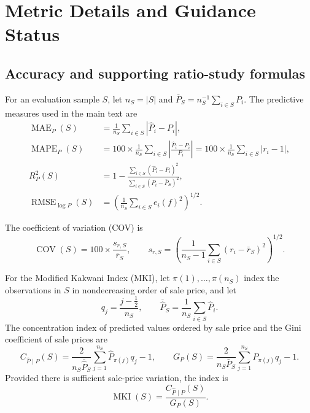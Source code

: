 \documentclass[10pt]{article}
\theoremstyle{definition}
\newcommand{\1}{\mathbf{1}}
\begin{document}
\printbibliography


\appendix

\section{Metric Details and Guidance Status}
\label{app:metrics}

\subsection{Accuracy and supporting ratio-study formulas}

For an evaluation sample $S$, let $n_S=|S|$ and $\bar P_S=n_S^{-1}\sum_{i\in S}P_i$. The predictive measures used in the main text are
\begin{align}
\label{eq:predictive_metrics}
\operatorname{MAE}_{P}(S)
&=
\frac{1}{n_S}\sum_{i\in S}\left|\widehat P_i-P_i\right|,
\\
{\operatorname{MAPE}_{P}(S)}
&{=100\times
\frac{1}{n_S}
\sum_{i\in S}
\left|
\frac{\widehat P_i-P_i}{P_i}
\right|
=100\times
\frac{1}{n_S}\sum_{i\in S}|r_i-1|},
\\
R^2_{P}(S)
&=
1-
\frac{\sum_{i\in S}(\widehat P_i-P_i)^2}
{\sum_{i\in S}(P_i-\bar P_S)^2},
\\
\operatorname{RMSE}_{\log P}(S)
&=
\left(
\frac{1}{n_S}\sum_{i\in S}e_i(f)^2
\right)^{1/2}.
\end{align}

The coefficient of variation (COV) is
\begin{equation}
\label{eq:cov}
\operatorname{COV}(S)
=
100\times
\frac{s_{r,S}}{\bar r_S},
\qquad
s_{r,S}
=
\left(
\frac{1}{n_S-1}
\sum_{i\in S}(r_i-\bar r_S)^2
\right)^{1/2}.
\end{equation}

For the Modified Kakwani Index (MKI), let $\pi(1),\allowbreak\ldots,\pi(n_S)$ index the observations in $S$ in nondecreasing order of sale price, and let
\[
q_j=\frac{j-\tfrac12}{n_S},
\qquad
\overline{\widehat P}_S
=
\frac{1}{n_S}\sum_{i\in S}\widehat P_i.
\]
The concentration index of predicted values ordered by sale price and the Gini coefficient of sale prices are
\begin{equation}
\label{eq:mki_components}
C_{\widehat P\mid P}(S)
=
\frac{2}{n_S\overline{\widehat P}_S}
\sum_{j=1}^{n_S}
\widehat P_{\pi(j)}q_j
-1,
\qquad
G_P(S)
=
\frac{2}{n_S\bar P_S}
\sum_{j=1}^{n_S}
P_{\pi(j)}q_j
-1.
\end{equation}
Provided there is sufficient sale-price variation, the index is
\begin{equation}
\label{eq:mki}
\operatorname{MKI}(S)
=
\frac{C_{\widehat P\mid P}(S)}{G_P(S)}.
\end{equation}
\end{document}
